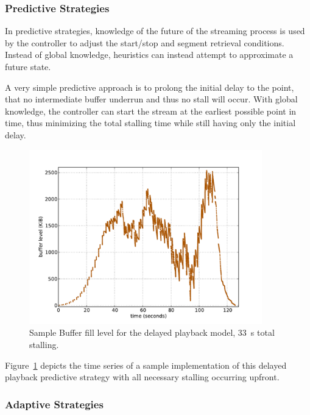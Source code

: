 \subsubsection{Predictive Strategies}

In predictive strategies, knowledge of the future of the streaming process is used by the controller to adjust the start/stop and segment retrieval conditions. Instead of global knowledge, heuristics can instead attempt to approximate a future state.

A very simple predictive approach is to prolong the initial delay to the point, that no intermediate buffer underrun and thus no stall will occur. With global knowledge, the controller can start the stream at the earliest possible point in time, thus minimizing the total stalling time while still having only the initial delay.

\begin{figure}[htb]
    \centering
    \includegraphics[width=0.9\textwidth]{images/bufferlevel-startdelay-new.pdf}
    \caption{Sample Buffer fill level for the delayed playback model, \SI{33}{\second} total stalling.}
    \label{c3:fig:bufferlevel-startdelay}
\end{figure}

Figure~\ref{c3:fig:bufferlevel-startdelay} depicts the time series of a sample implementation of this delayed playback predictive strategy with all necessary stalling occurring upfront.


\subsubsection{Adaptive Strategies}

